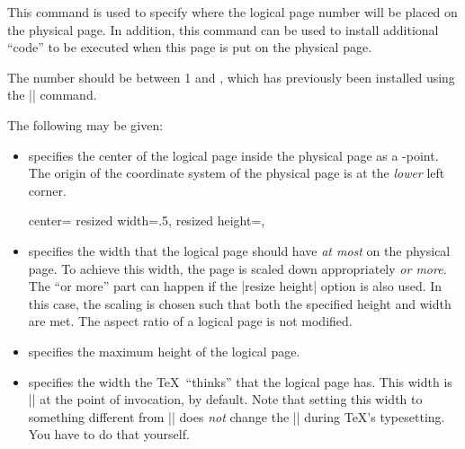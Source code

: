 \begin{command}{\pgfpageslogicalpageoptions{}}
    This command is used to specify where the logical page number  will be placed on the physical page. In addition, this command
    can be used to install additional ``code'' to be executed when this page is
    put on the physical page.

    The number  should be between 1 and , which has previously been installed using the
    |\pgfpagesphysicalpageoptions| command.

    The following  may be given:
    \begin{itemize}
        \item {} specifies the center of the
            logical page inside the physical page as a \pgfname-point. The
            origin of the coordinate system of the physical page is at the
            \emph{lower} left corner.
\begin{codeexample}
{%
  center=\pgfpoint{.25\pgfphysicalwidth}{.5\pgfphysicalheight}%
  resized width=.5\pgfphysicalwidth,%
  resized height=\pgfphysicalheight,%
}
\end{codeexample}
        \item {} specifies the width that
            the logical page should have \emph{at most} on the physical page.
            To achieve this width, the page is scaled down appropriately
            \emph{or more}. The ``or more'' part can happen if the
            |resize height| option is also used. In this case, the scaling is
            chosen such that both the specified height and width are met. The
            aspect ratio of a logical page is not modified.
        \item {} specifies the maximum
            height of the logical page.
        \item {} specifies the width the
            \TeX\ ``thinks'' that the logical page has. This width is
            |\paperwidth| at the point of invocation, by default. Note that
            setting this width to something different from |\paperwidth| does
            \emph{not} change the |\pagewidth| during \TeX's typesetting. You
            have to do that yourself.


\end{itemize}
\end{command}
